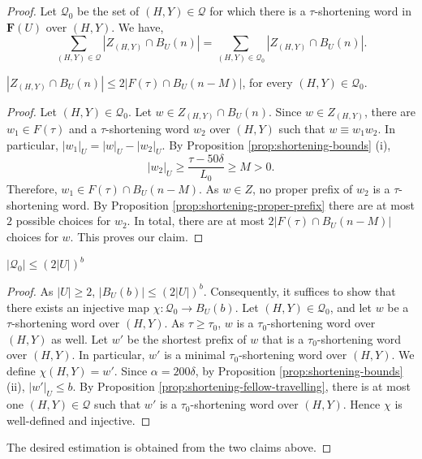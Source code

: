 \documentclass[10pt,a4paper]{amsart}
\newcommand{\F}{\mathbf{F}}
\newcommand{\scrQ}{\mathscr{Q}}
\begin{document}
\begin{proof}
	Let $\scrQ_0$ be the set of $(H,Y)\in\scrQ$ for which there is a $\tau$-shortening word in $\F(U)$ over $(H,Y)$. We have,
	$$\sum_{(H,Y)\in\scrQ}|Z_{(H,Y)}\cap B_U(n)|=\sum_{(H,Y)\in\scrQ_0}|Z_{(H,Y)}\cap B_U(n)|.$$
	
	\begin{cla}
		$|Z_{(H,Y)} \cap B_U(n)|\le 2|F(\tau) \cap B_U(n-M)|$, for every $(H,Y)\in \scrQ_0$.
	\end{cla}

	\begin{proof}
		Let $(H,Y)\in \scrQ_0$. Let $w\in Z_{(H,Y)} \cap B_U(n)$. Since $w\in Z_{(H,Y)}$, there are $w_1\in F(\tau)$ and a $\tau$-shortening word $w_2$ over $(H,Y)$ such that $w\equiv w_1w_2$. In particular, $|w_1|_U=|w|_U-|w_2|_U.$
		By Proposition \ref{prop:shortening-bounds} (i), 
		$$|w_2|_U\ge \frac{\tau-50\delta}{L_0}\ge M> 0.$$
		Therefore, $w_1\in F(\tau)\cap B_U(n-M)$. As $w\in Z$, no proper prefix of $w_2$ is a $\tau$-shortening word. By Proposition \ref{prop:shortening-proper-prefix} there are at most $2$ possible choices for $w_2$. In total, there are at most $2|F(\tau)\cap B_U(n-M)|$ choices for $w$. This proves our claim.
	\end{proof}
	
	\begin{cla}
		$|\scrQ_0|\le (2|U|)^{b}$
	\end{cla}

	\begin{proof}
As $|U|\ge 2$, $|B_U(b)|\le (2|U|)^{b}.$
		Consequently, it suffices to show that there exists an injective map $\chi\colon \scrQ_0\to B_U(b)$. Let $(H,Y)\in\scrQ_0$, and let $w$ be a $\tau$-shortening word over $(H,Y)$. 
		As $\tau\ge \tau_0$,  $w$ is a $\tau_0$-shortening word over $(H,Y)$ as well. Let $w'$ be the shortest prefix of $w$ that is a $\tau_0$-shortening word over $(H,Y)$. In particular, $w'$ is a minimal $\tau_0$-shortening word over $(H,Y)$. We define $\chi(H,Y)=w'$. Since $\alpha= 200\delta$, by Proposition \ref{prop:shortening-bounds} (ii), $|w'|_U\le b$.
		By Proposition \ref{prop:shortening-fellow-travelling}, there is at most one $(H,Y)\in\scrQ$ such that $w'$ is a $\tau_0$-shortening word over $(H,Y)$. Hence $\chi$ is well-defined and injective. 
	\end{proof}
	The desired estimation is obtained from the two claims above.	
\end{proof}
\end{document}
